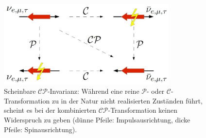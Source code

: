 \begin{figure}[hptb]
\centering
\includegraphics[width = 0.8\textwidth]{cp_invarianz}
\caption{Scheinbare $\mathcal{CP}$-Invarianz: Während eine reine $\mathcal{P}$- oder $\mathcal{C}$-Transformation zu in der Natur nicht realisierten Zuständen führt, scheint es bei der kombinierten $\mathcal{CP}$-Transformation keinen Widerspruch zu geben (dünne Pfeile: Impulsausrichtung, dicke Pfeile: Spinausrichtung).}
\label{fig:cp_invarianz}
\end{figure}

